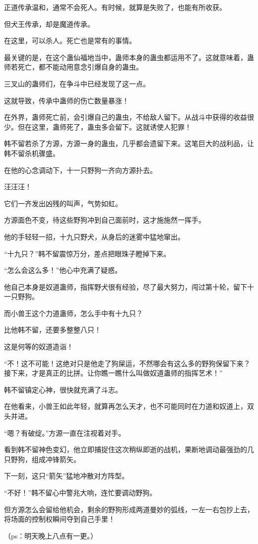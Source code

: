 \begin{this_body}
正道传承温和，通常不会死人。有时候，就算是失败了，也能有所收获。

但犬王传承，却是魔道传承。

在这里，可以杀人。死亡也是常有的事情。

最关键的是，在这个蛊仙福地当中，蛊师本身的蛊虫都运用不了。这就意味着，蛊师若死亡，都不能动用意念引爆自身的蛊虫。

三叉山的蛊师们，在争斗中已经发现了这一点。

这就导致，传承中蛊师的伤亡数量暴涨！

在外界，蛊师死亡前，会引爆自己的蛊虫，不给敌人留下。从战斗中获得的收益很少。但在这里，蛊师死了，蛊虫多会留下。这就诱使人犯罪！

韩不留若杀了方源，方源一身的蛊虫，几乎都会遗留下来。这笔巨大的战利品，让韩不留杀机骤盛。

在他的心念调动下，十一只野狗一齐向方源扑去。

汪汪汪！

它们一齐发出凶残的叫声，气势如虹。

方源面色不变，待这些野狗冲到自己面前时，这才施施然一挥手。

他的手轻轻一招，十九只野犬，从身后的迷雾中猛地窜出。

“十九只？”韩不留震惊万分，差点把眼珠子瞪掉下来。

“怎么会这么多！”他心中充满了疑惑。

他自己本身是奴道蛊师，指挥野犬很有经验，尽了最大努力，闯过第十轮，留下十一只野狗。

而小兽王这个力道蛊师，怎么手中有十九只？

比他韩不留，还要多整整八只！

这是何等的奴道造诣！

“不！这不可能！这绝对只是他走了狗屎运，不然哪会有这么多的野狗保留下来？接下来，才是真正的比拼。让你瞧一瞧什么叫做奴道蛊师的指挥艺术！”

韩不留镇定心神，很快就充满了斗志。

在他看来，小兽王如此年轻，就算再怎么天才，也不可能同时在力道和奴道上，双头并进。

“嗯？有破绽。”方源一直在注视着对手。

看到韩不留神色变幻，他立即捕捉住这次稍纵即逝的战机，果断地调动最强劲的几只野狗，组成冲锋箭矢。

下一刻，这只“箭矢”猛地冲散对方阵型。

“不好！”韩不留心中警兆大响，连忙要调动野狗。

但方源怎么会留给他机会，剩余的野狗形成两道曼妙的弧线，一左一右包抄上去，将场面的控制权瞬间夺到自己手里！

（ps：明天晚上八点有一更。）

\end{this_body}

